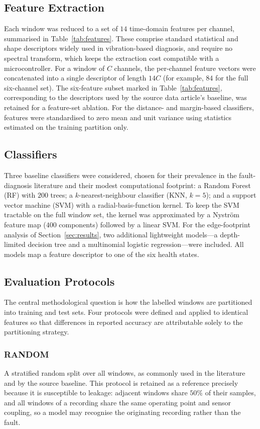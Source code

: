 \subsection{Feature Extraction}
Each window was reduced to a set of $14$ time-domain features per channel,
summarised in Table~\ref{tab:features}. These comprise standard statistical and
shape descriptors widely used in vibration-based diagnosis, and require no
spectral transform, which keeps the extraction cost compatible with a
microcontroller. For a window of $C$ channels, the per-channel feature vectors
were concatenated into a single descriptor of length $14C$ (for example, $84$ for
the full six-channel set). The six-feature subset marked in
Table~\ref{tab:features}, corresponding to the descriptors used by the source
data article's baseline, was retained for a feature-set ablation. For the
distance- and margin-based classifiers, features were standardised to zero mean
and unit variance using statistics estimated on the training partition only.

\subsection{Classifiers}
Three baseline classifiers were considered, chosen for their prevalence in the
fault-diagnosis literature and their modest computational footprint: a Random
Forest (RF) with $200$ trees; a $k$-nearest-neighbour classifier (KNN, $k=5$);
and a support vector machine (SVM) with a radial-basis-function kernel. To keep
the SVM tractable on the full window set, the kernel was approximated by a
Nystr\"om feature map ($400$ components) followed by a linear SVM. For the
edge-footprint analysis of Section~\ref{sec:results}, two additional
lightweight models---a depth-limited decision tree and a multinomial logistic
regression---were included. All models map a feature descriptor to one of the six
health states.

\subsection{Evaluation Protocols}
\label{subsec:protocols}
The central methodological question is how the labelled windows are partitioned
into training and test sets. Four protocols were defined and applied to identical
features so that differences in reported accuracy are attributable solely to the
partitioning strategy.

\subsubsection{RANDOM}
A stratified random split over all windows, as commonly used in the literature
and by the source baseline. This protocol is retained as a reference precisely
because it is susceptible to leakage: adjacent windows share $50\%$ of their
samples, and all windows of a recording share the same operating point and sensor
coupling, so a model may recognise the originating recording rather than the
fault.

